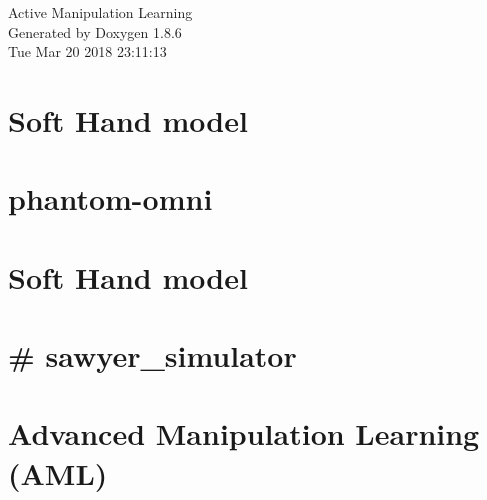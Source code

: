 \documentclass[twoside]{book}
\newcommand{\clearemptydoublepage}{%
  \newpage{\pagestyle{empty}\cleardoublepage}%
}
\begin{document}
\hypersetup{pageanchor=false}
\begin{titlepage}
\vspace*{7cm}
\begin{center}%
{\Large Active Manipulation Learning }\\
\vspace*{1cm}
{\large Generated by Doxygen 1.8.6}\\
\vspace*{0.5cm}
{\small Tue Mar 20 2018 23:11:13}\\
\end{center}
\end{titlepage}
\clearemptydoublepage
\tableofcontents
\clearemptydoublepage
{}
\hypersetup{pageanchor=true}

\chapter{Soft Hand model}
\label{md_aml_grasp_src_aml_grasp_models_pisa_iit_hand_soft_hand_description__r_e_a_d_m_e}
\hypertarget{md_aml_grasp_src_aml_grasp_models_pisa_iit_hand_soft_hand_description__r_e_a_d_m_e}{}

\chapter{phantom-\/omni}
\label{md_aml_haptics_aml_phantom_omni_omni_common__r_e_a_d_m_e}
\hypertarget{md_aml_haptics_aml_phantom_omni_omni_common__r_e_a_d_m_e}{}

\chapter{Soft Hand model}
\label{md_aml_rl_aml_rl_envs_src_aml_rl_envs_models_pisa_iit_hand_soft_hand_description__r_e_a_d_m_e}
\hypertarget{md_aml_rl_aml_rl_envs_src_aml_rl_envs_models_pisa_iit_hand_soft_hand_description__r_e_a_d_m_e}{}

\chapter{\# sawyer\-\_\-simulator}
\label{md_aml_sawyer_sim__r_e_a_d_m_e}
\hypertarget{md_aml_sawyer_sim__r_e_a_d_m_e}{}

\chapter{Advanced Manipulation Learning (A\-M\-L)}
\label{md__r_e_a_d_m_e}
\hypertarget{md__r_e_a_d_m_e}{}

\end{document}
